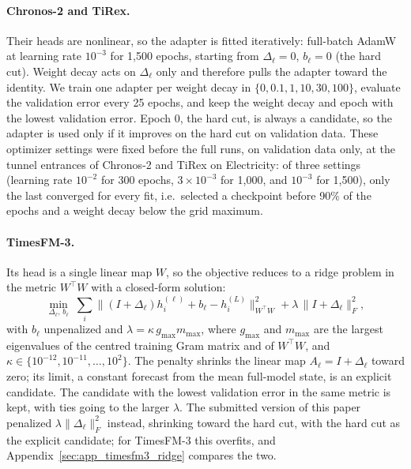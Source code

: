 \documentclass{article} %
\begin{document}
\paragraph{Chronos-2 and TiRex.} Their heads are nonlinear, so the adapter is fitted iteratively:
full-batch AdamW at learning rate $10^{-3}$ for 1,500 epochs, starting from $\Delta_\ell=0$,
$b_\ell=0$ (the hard cut). Weight decay acts on $\Delta_\ell$ only and therefore pulls the adapter
toward the identity. We train one adapter per weight decay in $\{0, 0.1, 1, 10, 30, 100\}$,
evaluate the validation error every 25 epochs, and keep the weight decay and epoch with the lowest
validation error. Epoch 0, the hard cut, is always a candidate, so the adapter is used only if it
improves on the hard cut on validation data. These optimizer settings were fixed before the full
runs, on validation data only, at the tunnel entrances of Chronos-2 and TiRex on Electricity: of
three settings (learning rate $10^{-2}$ for 300 epochs, $3\times10^{-3}$ for 1,000, and $10^{-3}$
for 1,500), only the last converged for every fit, i.e.\ selected a checkpoint before 90\% of the
epochs and a weight decay below the grid maximum.

\paragraph{TimesFM-3.} Its head is a single linear map $W$, so the objective reduces to a ridge
problem in the metric $W^\top W$ with a closed-form solution:
\begin{equation}
\min_{\Delta_\ell,\,b_\ell}\;\sum_{i}\bigl\|(I+\Delta_\ell)h_i^{(\ell)}+b_\ell-h_i^{(L)}\bigr\|_{W^\top W}^2
+\lambda\,\|I+\Delta_\ell\|_F^2,
\label{eq:adapter_ridge}
\end{equation}
with $b_\ell$ unpenalized and $\lambda=\kappa\,g_{\max}m_{\max}$, where $g_{\max}$ and $m_{\max}$
are the largest eigenvalues of the centred training Gram matrix and of $W^\top W$, and
$\kappa\in\{10^{-12},10^{-11},\dots,10^{2}\}$. The penalty shrinks the linear map
$A_\ell=I+\Delta_\ell$ toward zero; its limit, a constant forecast from the mean full-model state, is
an explicit candidate. The candidate with the lowest validation error in the same metric is kept,
with ties going to the larger $\lambda$. The submitted version of this paper penalized
$\lambda\|\Delta_\ell\|_F^2$ instead, shrinking toward the hard cut, with the hard cut as the
explicit candidate; for TimesFM-3 this overfits, and Appendix~\ref{sec:app_timesfm3_ridge} compares
the two.
\end{document}
